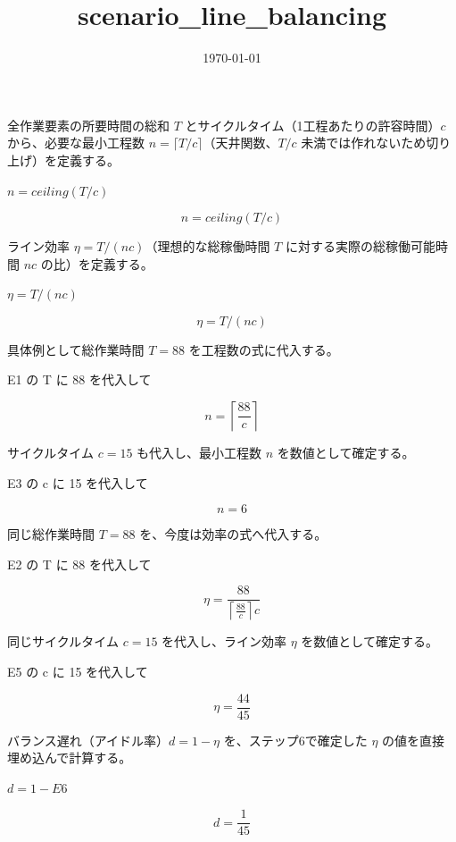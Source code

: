 \documentclass[dvipdfmx,a4paper,11pt]{jsarticle}
\title{scenario\_line\_balancing}
\date{\today}
\begin{document}
\maketitle

全作業要素の所要時間の総和 $T$ とサイクルタイム（1工程あたりの許容時間）$c$ から、必要な最小工程数 $n=\lceil T/c\rceil$（天井関数、$T/c$ 未満では作れないため切り上げ）を定義する。

$n = ceiling(T / c)$

\begin{equation}
  n = ceiling(T / c)
  \label{eq:E1}
\end{equation}

ライン効率 $\eta=T/(nc)$（理想的な総稼働時間 $T$ に対する実際の総稼働可能時間 $nc$ の比）を定義する。

$\eta = T / (n c)$

\begin{equation}
  \eta = T / (n c)
  \label{eq:E2}
\end{equation}

具体例として総作業時間 $T=88$ を工程数の式に代入する。

E1 の T に 88 を代入して

\begin{equation}
  n = \left \lceil \frac{88}{c} \right \rceil
  \label{eq:E3}
\end{equation}

サイクルタイム $c=15$ も代入し、最小工程数 $n$ を数値として確定する。

E3 の c に 15 を代入して

\begin{equation}
  n = 6
  \label{eq:E4}
\end{equation}

同じ総作業時間 $T=88$ を、今度は効率の式へ代入する。

E2 の T に 88 を代入して

\begin{equation}
  \eta = \frac{88}{\left \lceil \frac{88}{c} \right \rceil c}
  \label{eq:E5}
\end{equation}

同じサイクルタイム $c=15$ を代入し、ライン効率 $\eta$ を数値として確定する。

E5 の c に 15 を代入して

\begin{equation}
  \eta = \frac{44}{45}
  \label{eq:E6}
\end{equation}

バランス遅れ（アイドル率）$d=1-\eta$ を、ステップ6で確定した $\eta$ の値を直接埋め込んで計算する。

$d = 1 - E6$

\begin{equation}
  d = \frac{1}{45}
  \label{eq:E7}
\end{equation}
\end{document}
